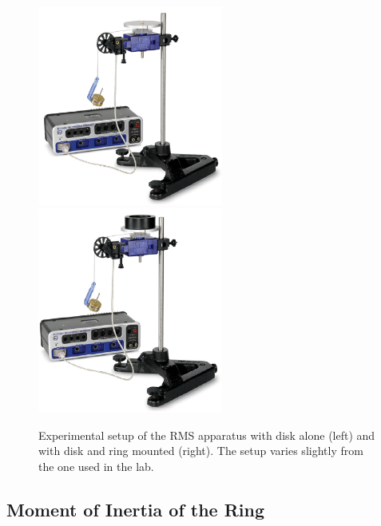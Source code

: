\begin{figure}
  \begin{center}
    \includegraphics[width=2.4in]{Experiment09Figures/Figure03a.pdf}
    \includegraphics[width=2.4in]{Experiment09Figures/Figure03b.pdf}
  \end{center}
  \caption{Experimental setup of the RMS apparatus with disk alone (left) and with disk and ring mounted (right). The setup varies slightly from the one used in the lab.}
  \label{M08Fig03}
\end{figure}

\subsection{Moment of Inertia of the Ring}

